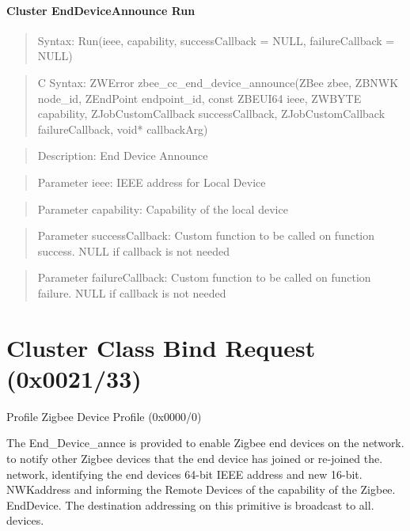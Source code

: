 \paragraph{Cluster EndDeviceAnnounce Run}
\begin{quote}Syntax: Run(ieee, capability, successCallback = NULL, failureCallback = NULL)\end{quote}
\begin{quote}C Syntax: ZWError zbee\_cc\_end\_device\_announce(ZBee zbee, ZBNWK node\_id, ZEndPoint endpoint\_id, const ZBEUI64 ieee, ZWBYTE capability, ZJobCustomCallback successCallback, ZJobCustomCallback failureCallback, void* callbackArg)\end{quote}
\begin{quote}Description: End Device Announce\end{quote}
\begin{quote}Parameter ieee: IEEE address for Local Device\end{quote}
\begin{quote}Parameter capability: Capability of the local device\end{quote}
\begin{quote}Parameter successCallback: Custom function to be called on function success. NULL if callback is not needed\end{quote}
\begin{quote}Parameter failureCallback: Custom function to be called on function failure. NULL if callback is not needed\end{quote}



\section{Cluster Class Bind Request (0x0021/33)}

Profile Zigbee Device Profile (0x0000/0)

The End\_Device\_annce is provided to enable Zigbee end devices on the network. to notify other Zigbee devices that the end device has joined or re-joined the. network, identifying the end devices 64-bit IEEE address and new 16-bit. NWKaddress and informing the Remote Devices of the capability of the Zigbee. EndDevice. The destination addressing on this primitive is broadcast to all. devices.
